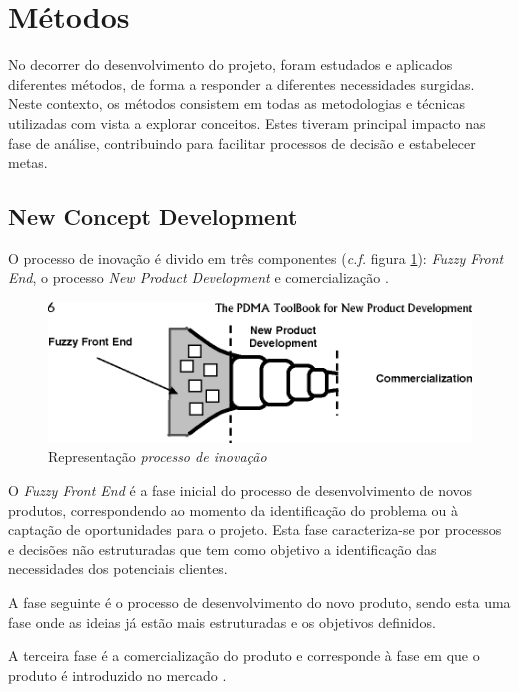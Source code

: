 \section{Métodos}
No decorrer do desenvolvimento do projeto, foram estudados e aplicados diferentes métodos, de forma a responder a diferentes necessidades surgidas. Neste contexto, os métodos consistem em todas as metodologias e técnicas utilizadas com vista a explorar conceitos. Estes tiveram principal impacto nas fase de análise, contribuindo para facilitar processos de decisão e estabelecer metas.

\subsection{New Concept Development}
O processo de inovação é divido em três componentes (\emph{c.f.} figura \ref{figura_processo_inovacao}): \emph{Fuzzy
Front End}, o processo \emph{New Product Development} e comercialização \cite{fuzzy_frontend}.

\begin{figure}[H]
    \begin{center}
    \includegraphics[width=1\textwidth]{figures/new_product_development.png}
    \caption{Representação \emph{processo de inovação}}
    \label{figura_processo_inovacao}
    \end{center}
\end{figure}

O \emph{Fuzzy Front End} é a fase inicial do processo de desenvolvimento de novos produtos, correspondendo ao momento da identificação do problema ou à captação de oportunidades para o
projeto. Esta fase caracteriza-se por processos e decisões não estruturadas que tem como objetivo a identificação das necessidades dos potenciais clientes. 

A fase seguinte é o processo de  desenvolvimento do novo produto, sendo esta uma fase onde as ideias já estão mais estruturadas e os objetivos definidos. 

A terceira fase é a comercialização do produto e corresponde à fase em que o produto é introduzido no mercado \cite{fuzzy_frontend}.

